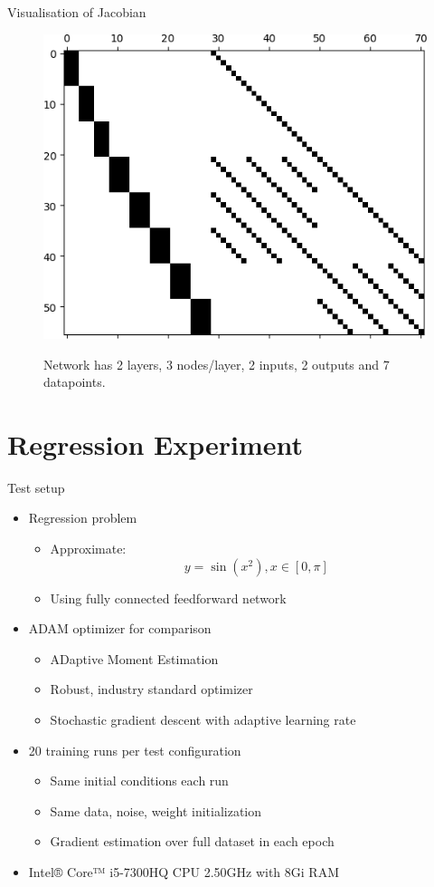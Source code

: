 \documentclass[11pt,t]{beamer}
\begin{document}
\begin{frame}[fragile]{Visualisation of Jacobian}
	\begin{figure}
	  \centering
	  \includegraphics[width=.7\textwidth]{jac1.png} \\
	  \caption*{Network has 2 layers, 3 nodes/layer,  2 inputs, 2 outputs and 7 datapoints.}
	  \end{figure}
\end{frame}

\section{Regression Experiment}


\begin{frame}[fragile]{Test setup}
	\begin{itemize}
		\item Regression problem
		\begin{itemize}
			\item Approximate:
			\begin{equation*}y = \sin(x^2), x \in [0,\pi]\end{equation*}
			\item Using fully connected feedforward network
		\end{itemize}
		\item ADAM optimizer for comparison
		\begin{itemize}
			\item ADaptive Moment Estimation
			\item Robust, industry standard optimizer
			\item Stochastic gradient descent with adaptive learning rate
		\end{itemize}
		\item 20 training runs per test configuration
		\begin{itemize}
			\item Same initial conditions each run
			\item Same data, noise, weight initialization
			\item Gradient estimation over full dataset in each epoch
		\end{itemize}
		\item Intel® Core™ i5-7300HQ CPU \@ 2.50GHz with 8Gi RAM
	\end{itemize}
\end{frame}
\end{document}
